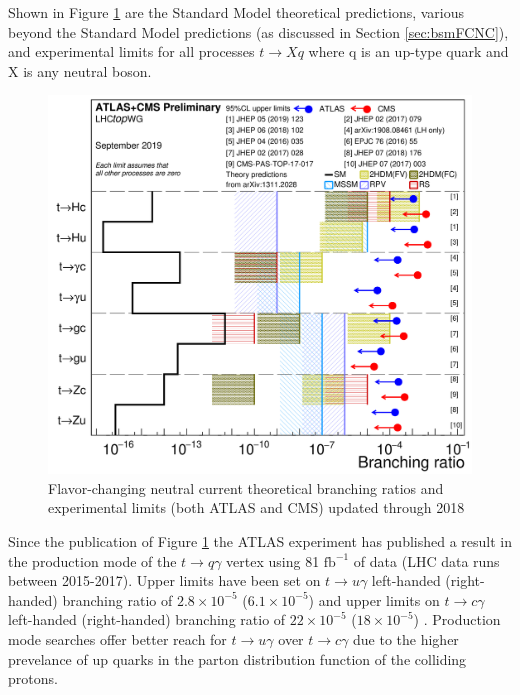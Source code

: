 Shown in Figure \ref{fig:FCNClimits} are the Standard Model theoretical predictions, various beyond the Standard Model predictions (as discussed in Section \ref{sec:bsmFCNC}), and experimental limits for all processes $t\rightarrow Xq$ where q is an up-type quark and X is any neutral boson.  
\begin{figure}[h!]
	\centering
	\includegraphics[width=.9\columnwidth]{../ThesisImages/Theory/AllFCNCLimits.png}
	\caption[Flavor-changing neutral current theoretical branching ratios and experimental limits (both ATLAS and CMS) updated through 2018 ]{Flavor-changing neutral current theoretical branching ratios and experimental limits (both ATLAS and CMS) updated through 2018 \cite{TopWG} }
	\label{fig:FCNClimits}
\end{figure}

Since the publication of Figure \ref{fig:FCNClimits} the ATLAS experiment has published a result in the production mode of the $t\rightarrow q\gamma$ vertex using 81 $\text{fb}^{-1}$ of data (LHC data runs between 2015-2017).  Upper limits have been set on $t\rightarrow u \gamma$ left-handed (right-handed) branching ratio of $2.8\times 10^{-5}$ ($6.1\times 10^{-5}$) and upper limits on $t \rightarrow c \gamma$ left-handed (right-handed) branching ratio of $22\times10^{-5}$ ($18\times10^{-5}$) \cite{GregorFCNC}.  Production mode searches offer better reach for $t\rightarrow u \gamma$ over $t\rightarrow c \gamma$ due to the higher prevelance of up quarks in the parton distribution function of the colliding protons.


